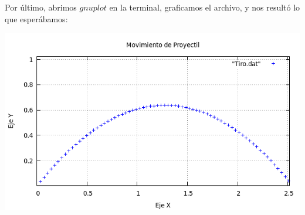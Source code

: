 \documentclass[12pt]{article}
\begin{document}
Por último, abrimos $gnuplot$ en la terminal, graficamos el archivo, y nos resultó lo que esperábamos:


\begin{center}
	\includegraphics[width=15cm]{graf.png}\\
\end{center}

\end{document}
